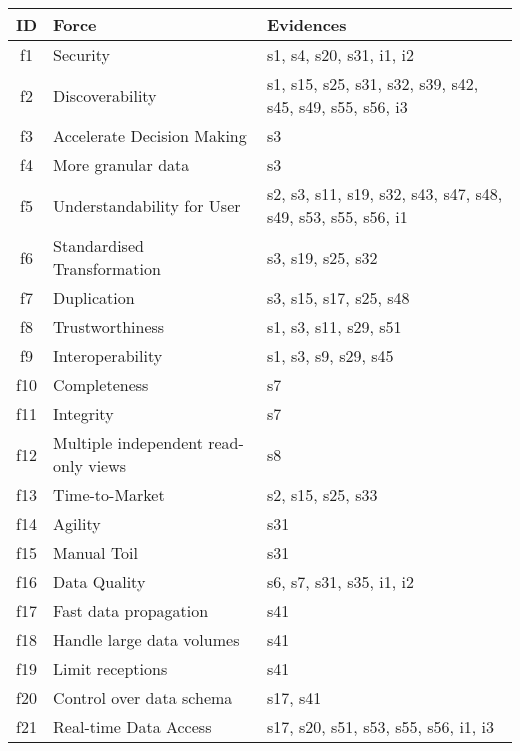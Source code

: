 \begin{tabular}{|c|p{}|p{}|}
\hline
{\bf ID} & {\bf Force} & {\bf Evidences}\\
\hline
f1 & Security & \cellcolor{emerald_shape_3} {s1, s4, s20, s31, i1, i2}\\
f2 & Discoverability & \cellcolor{emerald_shape_4} {s1, s15, s25, s31, s32, s39, s42, s45, s49, s55, s56, i3}\\
f3 & Accelerate Decision Making & \cellcolor{emerald_shape_1} {s3}\\
f4 & More granular data & \cellcolor{emerald_shape_1} {s3}\\
f5 & Understandability for User & \cellcolor{emerald_shape_4} {s2, s3, s11, s19, s32, s43, s47, s48, s49, s53, s55, s56, i1}\\
f6 & Standardised Transformation & \cellcolor{emerald_shape_2} {s3, s19, s25, s32}\\
f7 & Duplication & \cellcolor{emerald_shape_2} {s3, s15, s17, s25, s48}\\
f8 & Trustworthiness & \cellcolor{emerald_shape_2} {s1, s3, s11, s29, s51}\\
f9 & Interoperability & \cellcolor{emerald_shape_2} {s1, s3, s9, s29, s45}\\
f10 & Completeness & \cellcolor{emerald_shape_1} {s7}\\
f11 & Integrity & \cellcolor{emerald_shape_1} {s7}\\
f12 & Multiple independent read-only views & \cellcolor{emerald_shape_1} {s8}\\
f13 & Time-to-Market & \cellcolor{emerald_shape_2} {s2, s15, s25, s33}\\
f14 & Agility & \cellcolor{emerald_shape_1} {s31}\\
f15 & Manual Toil & \cellcolor{emerald_shape_1} {s31}\\
f16 & Data Quality & \cellcolor{emerald_shape_3} {s6, s7, s31, s35, i1, i2}\\
f17 & Fast data propagation & \cellcolor{emerald_shape_1} {s41}\\
f18 & Handle large data volumes & \cellcolor{emerald_shape_1} {s41}\\
f19 & Limit receptions & \cellcolor{emerald_shape_1} {s41}\\
f20 & Control over data schema & \cellcolor{emerald_shape_1} {s17, s41}\\
f21 & Real-time Data Access & \cellcolor{emerald_shape_3} {s17, s20, s51, s53, s55, s56, i1, i3}\\

\end{tabular}
